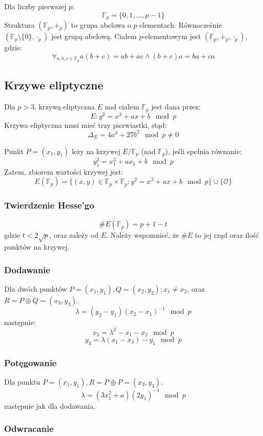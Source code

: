 \documentclass{../notatki}
\begin{document}
Dla liczby pierwszej $p$:
$$
\mathbb{F}_p = \{0, 1, \ldots, p-1\}
$$
Struktura $(\mathbb{F}_p, +_p)$ to grupa abelowa o $p$ elementach. Równocześnie
$(\mathbb{F}_p \setminus \{0\}, \cdot_p)$ jest grupą abelową. Ciałem
$p$-elementowym jest $(\mathbb{F}_p, +_p, \cdot_p)$, gdzie:
$$
\forall_{a, b, c \in \mathbb{F}_p} a (b + c) = ab + ac \land (b + c)a = ba + ca
$$

\subsection{Krzywe eliptyczne}

Dla $p > 3$, krzywą eliptyczna $E$ nad ciałem $\mathbb{F}_p$ jest dana przez:
$$
E: y^2 = x^3 + ax + b \mod p
$$
Krzywa eliptyczna musi mieć trzy pierwiastki, stąd:
$$
\Delta_E = 4a^3 + 27b^2 \mod p \neq 0
$$

Punkt $P = (x_1, y_1)$ leży na krzywej $E / \mathbb{F}_p$ (nad
$\mathbb{F}_p$), jeśli spełnia równanie:
$$
y_1^2 = x_1^3 + ax_1 + b \mod p
$$
Zatem, zbiorem wartości krzywej jest:
$$
E(\mathbb{F}_p) = \{(x, y) \in \mathbb{F}_p \times \mathbb{F}_p : y^2
= x^3 + ax + b \mod p\} \cup \{\mathcal{O}\}
$$

\subsubsection{Twierdzenie Hesse'go}

$$
\#E(\mathbb{F}_p) = p + 1 - t
$$
gdzie $t < 2\sqrt{p}$, oraz zależy od $E$. Należy wspomnieć, że $\#E$ to jej
rząd oraz ilość punktów na krzywej.

\subsubsection{Dodawanie}

Dla dwóch punktów $P = (x_1, y_1), Q = (x_2, y_2); x_1 \neq x_2$,
oraz $R = P \oplus Q = (x_3, y_3)$.
$$
\lambda = (y_2 - y_1)(x_2 - x_1)^{-1} \mod p
$$
następnie:
$$
x_3 = \lambda^2 - x_1 - x_2 \mod p
$$
$$
y_3 = \lambda(x_1 - x_3) - y_1 \mod p
$$

\subsubsection{Potęgowanie}

Dla punktu $P = (x_1, y_1), R = P \oplus P = (x_3, y_3)$.
$$
\lambda = (3x_1^2 + a)(2y_1)^{-1} \mod p
$$
następnie jak dla dodawania.

\subsubsection{Odwracanie}
\end{document}
